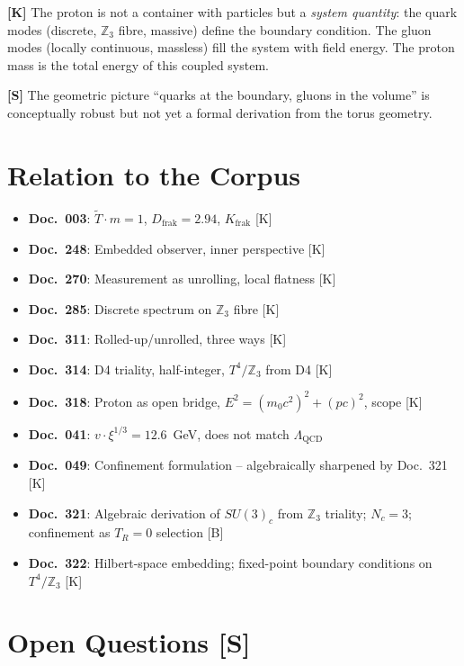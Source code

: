 \textbf{[K]} The proton is not a container with particles but a
\emph{system quantity}: the quark modes (discrete, $\mathbb{Z}_3$ fibre,
massive) define the boundary condition. The gluon modes (locally
continuous, massless) fill the system with field energy. The proton
mass is the total energy of this coupled system.

\textbf{[S]} The geometric picture ``quarks at the boundary, gluons in
the volume'' is conceptually robust but not yet a formal derivation from
the torus geometry.

\section{Relation to the Corpus}

\begin{itemize}
  \item \textbf{Doc.~003}: $\tilde{T}\cdot m=1$, $D_\text{frak}=2.94$,
    $K_\text{frak}$ [K]
  \item \textbf{Doc.~248}: Embedded observer, inner perspective [K]
  \item \textbf{Doc.~270}: Measurement as unrolling, local flatness [K]
  \item \textbf{Doc.~285}: Discrete spectrum on $\mathbb{Z}_3$ fibre [K]
  \item \textbf{Doc.~311}: Rolled-up/unrolled, three ways [K]
  \item \textbf{Doc.~314}: D4 triality, half-integer,
    $T^4/\mathbb{Z}_3$ from D4 [K]
  \item \textbf{Doc.~318}: Proton as open bridge,
    $E^2=(m_0c^2)^2+(pc)^2$, scope [K]
  \item \textbf{Doc.~041}: $v\cdot\xi^{1/3} = 12.6$~GeV, does not match $\Lambda_\text{QCD}$
  \item \textbf{Doc.~049}: Confinement formulation -- algebraically
    sharpened by Doc.~321 [K]
  \item \textbf{Doc.~321}: Algebraic derivation of $SU(3)_c$ from
    $\mathbb{Z}_3$ triality; $N_c=3$; confinement as $T_R=0$ selection [B]
  \item \textbf{Doc.~322}: Hilbert-space embedding; fixed-point boundary
    conditions on $T^4/\mathbb{Z}_3$ [K]
\end{itemize}

\section{Open Questions [S]}


